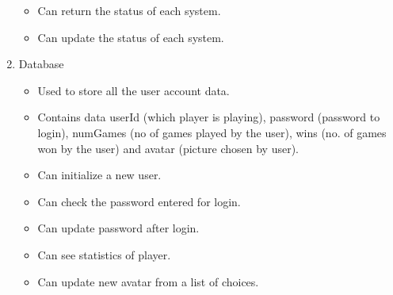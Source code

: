 \begin{enumerate}
\begin{itemize}
\item Can return the status of each system.
\item Can update the status of each system.
\end{itemize}
\item Database
\begin{itemize}
\item Used to store all the user account data.
\item Contains data userId (which player is playing), password (password to login), numGames (no of games played by the user), wins (no. of games won by the user) and avatar (picture chosen by user).
\item Can initialize a new user.
\item Can check the password entered for login.
\item Can update password after login.
\item Can see statistics of player.
\item Can update new avatar from a list of choices.
\end{itemize}
\end{enumerate}
